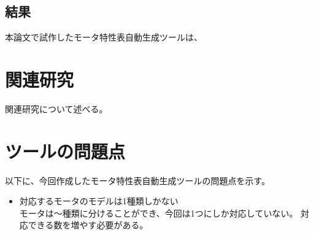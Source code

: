 \subsection{結果}
本論文で試作したモータ特性表自動生成ツールは、

\section{関連研究}

	関連研究について述べる。

\section{ツールの問題点}

以下に、今回作成したモータ特性表自動生成ツールの問題点を示す。

\begin{itemize}
	\item 対応するモータのモデルは1種類しかない\\
		  モータは～種類に分けることができ、今回は1つにしか対応していない。
		  対応できる数を増やす必要がある。
		
\end{itemize}







